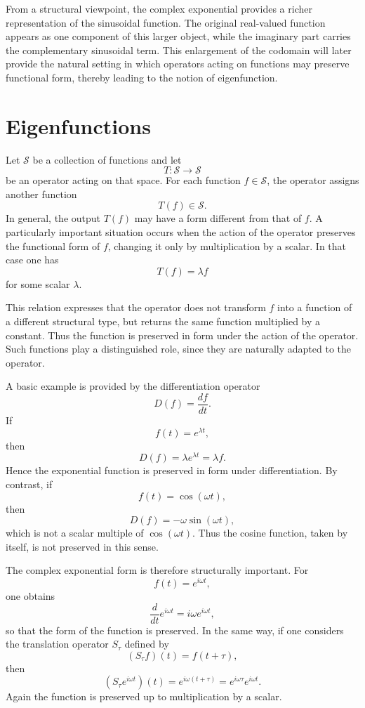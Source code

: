 \documentclass{article}
\begin{document}
	From a structural viewpoint, the complex exponential provides a richer representation of the sinusoidal function. The original real-valued function appears as one component of this larger object, while the imaginary part carries the complementary sinusoidal term. This enlargement of the codomain will later provide the natural setting in which operators acting on functions may preserve functional form, thereby leading to the notion of eigenfunction.
	
	\section*{Eigenfunctions}
	
	Let \(\mathcal{S}\) be a collection of functions and let
	\[
	T:\mathcal{S}\to\mathcal{S}
	\]
	be an operator acting on that space. For each function \(f\in\mathcal{S}\), the operator assigns another function
	\[
	T(f)\in\mathcal{S}.
	\]
	In general, the output \(T(f)\) may have a form different from that of \(f\). A particularly important situation occurs when the action of the operator preserves the functional form of \(f\), changing it only by multiplication by a scalar. In that case one has
	\[
	T(f)=\lambda f
	\]
	for some scalar \(\lambda\).
	
	This relation expresses that the operator does not transform \(f\) into a function of a different structural type, but returns the same function multiplied by a constant. Thus the function is preserved in form under the action of the operator. Such functions play a distinguished role, since they are naturally adapted to the operator.
	
	A basic example is provided by the differentiation operator
	\[
	D(f)=\frac{df}{dt}.
	\]
	If
	\[
	f(t)=e^{\lambda t},
	\]
	then
	\[
	D(f)=\lambda e^{\lambda t}=\lambda f.
	\]
	Hence the exponential function is preserved in form under differentiation. By contrast, if
	\[
	f(t)=\cos(\omega t),
	\]
	then
	\[
	D(f)=-\omega \sin(\omega t),
	\]
	which is not a scalar multiple of \(\cos(\omega t)\). Thus the cosine function, taken by itself, is not preserved in this sense.
	
	The complex exponential form is therefore structurally important. For
	\[
	f(t)=e^{i\omega t},
	\]
	one obtains
	\[
	\frac{d}{dt}e^{i\omega t}=i\omega e^{i\omega t},
	\]
	so that the form of the function is preserved. In the same way, if one considers the translation operator \(S_\tau\) defined by
	\[
	(S_\tau f)(t)=f(t+\tau),
	\]
	then
	\[
	(S_\tau e^{i\omega t})(t)=e^{i\omega(t+\tau)}=e^{i\omega\tau}e^{i\omega t}.
	\]
	Again the function is preserved up to multiplication by a scalar.
	
\end{document}
